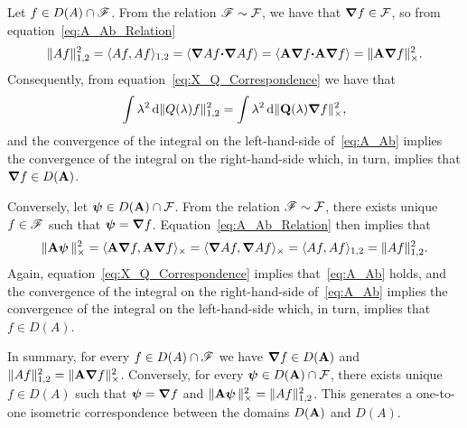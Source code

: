 \documentclass[amsa]{ipart}
\begin{document}
Let $f\in D(A)\cap\mathscr{F}$. From the relation
$\mathscr{F}\sim\mathcal{F}$, we have that $\mbox{\boldmath${\nabla}$} f\in\mathcal{F}$, so from
equation~\eqref{eq:A_Ab_Relation}    
%
\begin{align}\label{eq:Norm_A_Ab}
  \|Af\|_{1,2}^2=\langle Af,Af\rangle_{1,2}
        =\langle\bnabla  A f\bcdot\bnabla  A f\rangle
        =\langle\Ab\bnabla f\bcdot\Ab\bnabla f\rangle
        =\|\Ab\bnabla f\|_\times^2.
\end{align}
%
Consequently, from equation~\eqref{eq:X_Q_Correspondence} we have that
%
\begin{align}\label{eq:A_Ab}
  \int\lambda^2\,\d\|Q(\lambda)f\|_{1,2}^2=\int\lambda^2\,\d\|\Qb(\lambda)\bnabla f\|_\times^2,
\end{align}
%
and the convergence of the integral on the left-hand-side
of~\eqref{eq:A_Ab} implies the convergence of the integral on the
right-hand-side which, in turn, implies that $\mbox{\boldmath${\nabla}$} f\in D(\mathbf{A})$.


Conversely, let $\boldsymbol{\psi}\in D(\mathbf{A})\cap\mathcal{F}$. From the
relation $\mathscr{F}\sim\mathcal{F}$, there exists unique $f\in\mathscr{F}$ such that
$\boldsymbol{\psi}=\mbox{\boldmath${\nabla}$} f$. Equation~\eqref{eq:A_Ab_Relation} then
implies that     
%
\begin{align}
  \|\Ab\vecpsi\,\|_\times^2=\langle\Ab\bnabla f,\Ab\bnabla f\rangle_\times
         =\langle\bnabla  A f,\bnabla  A f\rangle_\times
         =\langle Af,Af\rangle_{1,2}
         =\|Af\|_{1,2}^2.
\end{align}
%
Again, equation~\eqref{eq:X_Q_Correspondence} implies
that~\eqref{eq:A_Ab} holds, and the convergence of the integral on the
right-hand-side of~\eqref{eq:A_Ab} implies the 
convergence of the integral on the left-hand-side which, in turn, implies that
$f\in D(A)$.


In summary, for every $f\in D(A)\cap\mathscr{F}$ we have
$\mbox{\boldmath${\nabla}$} f\in D(\mathbf{A})$ and $\|Af\|_{1,2}^2=\|\mathbf{A}\mbox{\boldmath${\nabla}$} f\|_\times^2$. Conversely,
for every $\boldsymbol{\psi}\in D(\mathbf{A})\cap\mathcal{F}$, there exists
unique $f\in D(A)$ such that $\boldsymbol{\psi}=\mbox{\boldmath${\nabla}$} f$ and
$\|\mathbf{A}\boldsymbol{\psi}\,\|_\times^2=\|Af\|_{1,2}^2$. This generates a one-to-one isometric
correspondence between the domains $D(\mathbf{A})$ and $D(A)$.       
\end{document}
